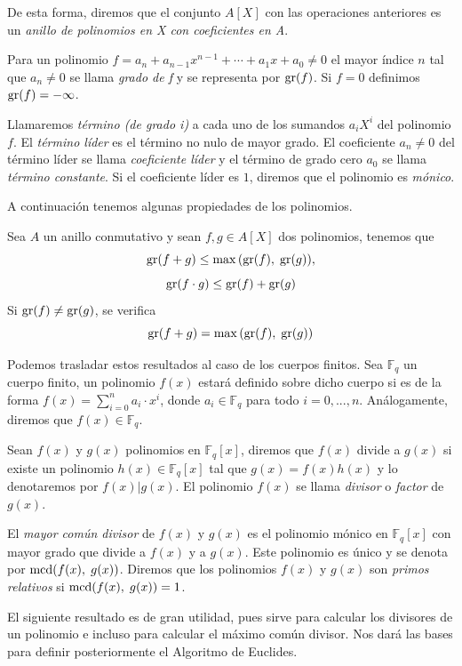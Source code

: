 De esta forma, diremos que el conjunto $A[X]$ con las operaciones anteriores es un \emph{anillo de polinomios en X con coeficientes en A}.

\begin{definition}
    Para un polinomio $f = a_n + a_{n-1} x^{n-1} + \cdots + a_1 x + a_0 \neq 0$ el mayor índice $n$ tal que $a_n \neq 0$ se llama \emph{grado de f} y se representa por $\operatorname{gr}(f)$. Si $f = 0$ definimos $\operatorname{gr}(f) = - \infty$.

    Llamaremos \emph{término (de grado i)} a cada uno de los sumandos $a_i X^i$ del polinomio $f$. El \emph{término líder} es el término no nulo de mayor grado. El coeficiente $a_n \neq 0$ del término líder se llama \emph{coeficiente líder} y el término de grado cero $a_0$ se llama \emph{término constante}. Si el coeficiente líder es $1$, diremos que el polinomio es \emph{mónico}.
\end{definition}

A continuación tenemos algunas propiedades de los polinomios.

\begin{proposition}
    Sea $A$ un anillo conmutativo y sean $f,g \in A[X]$ dos polinomios, tenemos que 
    $$\operatorname{gr}(f + g) \leq \max{(\operatorname{gr}(f), \; \operatorname{gr}(g))},$$
    $$\operatorname{gr}(f \cdot g) \leq \operatorname{gr}(f) + \operatorname{gr}(g)$$
    Si $\operatorname{gr}(f) \neq \operatorname{gr}(g)$, se verifica 
    $$\operatorname{gr}(f + g) = \max{(\operatorname{gr}(f), \; \operatorname{gr}(g))}$$
\end{proposition}

Podemos trasladar estos resultados al caso de los cuerpos finitos. Sea $\mathbb{F}_q$ un cuerpo finito, un polinomio $f(x)$ estará definido sobre dicho cuerpo si es de la forma $f(x) = \sum_{i = 0}^{n} a_i \cdot x^i$, donde $a_i \in \mathbb{F}_q$ para todo $i = 0, ..., n$. Análogamente, diremos que $f(x) \in \mathbb{F}_q$.

Sean $f(x)$ y $g(x)$ polinomios en $\mathbb{F}_q[x]$, diremos que $f(x)$ divide a $g(x)$ si existe un polinomio $h(x) \in \mathbb{F}_q[x]$ tal que $g(x) = f(x) h(x)$ y lo denotaremos por $f(x) \vert g(x)$. El polinomio $f(x)$ se llama \emph{divisor} o \emph{factor} de $g(x)$.

El \emph{mayor común divisor} de $f(x)$ y $g(x)$ es el polinomio mónico en $\mathbb{F}_q[x]$ con mayor grado que divide a $f(x)$ y a $g(x)$. Este polinomio es único y se denota por $\operatorname{mcd}(f(x), \; g(x))$. Diremos que los polinomios $f(x)$ y $g(x)$ son \emph{primos relativos} si $\operatorname{mcd}(f(x), \; g(x)) = 1$.

El siguiente resultado es de gran utilidad, pues sirve para calcular los divisores de un polinomio e incluso para calcular el máximo común divisor. Nos dará las bases para definir posteriormente el Algoritmo de Euclides.

